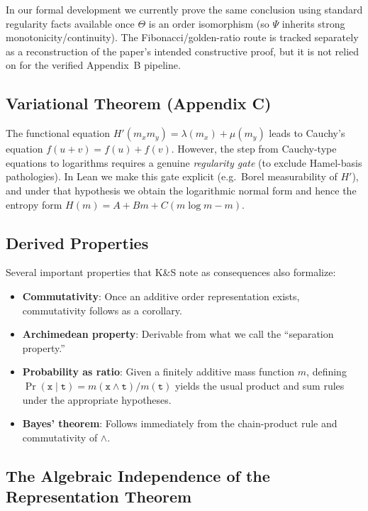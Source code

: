 \documentclass[11pt]{article}
\begin{document}
In our formal development we currently prove the same conclusion using standard regularity facts
available once $\Theta$ is an order isomorphism (so $\Psi$ inherits strong monotonicity/continuity).
The Fibonacci/golden-ratio route is tracked separately as a reconstruction of the paper’s intended
constructive proof, but it is not relied on for the verified Appendix~B pipeline.

\subsection{Variational Theorem (Appendix C)}

The functional equation $H'(m_x m_y) = \lambda(m_x) + \mu(m_y)$ leads to Cauchy's
equation $f(u+v) = f(u) + f(v)$. However, the step from Cauchy-type equations to logarithms
requires a genuine \emph{regularity gate} (to exclude Hamel-basis pathologies). In Lean we make this
gate explicit (e.g.\ Borel measurability of $H'$), and under that hypothesis we obtain
the logarithmic normal form and hence the entropy form
$H(m) = A + Bm + C(m \log m - m)$.

\subsection{Derived Properties}

Several important properties that K\&S note as consequences also formalize:

\begin{itemize}[noitemsep]
\item \textbf{Commutativity}: Once an additive order representation exists, commutativity
follows as a corollary.
\item \textbf{Archimedean property}: Derivable from what we call the ``separation property.''
\item \textbf{Probability as ratio}: Given a finitely additive mass function $m$, defining
$\Pr(\mathtt{x} \mid \mathtt{t}) = m(\mathtt{x} \land \mathtt{t}) / m(\mathtt{t})$ yields the usual
product and sum rules under the appropriate hypotheses.
\item \textbf{Bayes' theorem}: Follows immediately from the chain-product rule and commutativity of $\land$.
\end{itemize}

\subsection{The Algebraic Independence of the Representation Theorem}
\end{document}
